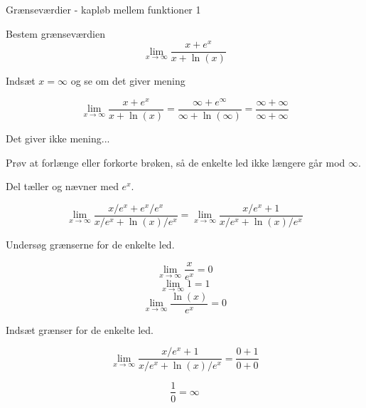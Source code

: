 \documentclass{article}
\begin{document}
\tableofcontents
\newpage

\begin{exercise}{Grænseværdier - kapløb mellem funktioner 1}

Bestem grænseværdien
\[
\lim_{x \to \infty} \frac{x + e^x}{x + \ln(x)}
\]


\hint
Indsæt $x=\infty$ og se om det giver mening

\hint
\[
\lim_{x \to \infty} \frac{x + e^x}{x + \ln(x)} = \frac{\infty + e^\infty}{\infty + \ln(\infty)} = \frac{\infty + \infty}{\infty + \infty}
\]

\hint
Det giver ikke mening...

\hint
Prøv at forlænge eller forkorte brøken, så de enkelte led ikke længere går mod $\infty$.

\hint
Del tæller og nævner med $e^x$.

\hint
\[
 \lim_{x \to \infty} \frac{x/e^x + e^x/e^x}{x/e^x + \ln(x)/e^x} = \lim_{x \to \infty} \frac{x/e^x + 1}{x/e^x + \ln(x)/e^x}
\]

\hint
Undersøg grænserne for de enkelte led.

\hint
\[
\lim_{x \to \infty} \frac{x}{e^x} = 0
\]
\[
\lim_{x \to \infty} 1 = 1
\]
\[
\lim_{x \to \infty} \frac{\ln(x)}{e^x} = 0
\]

\hint
Indsæt grænser for de enkelte led.

\hint
\[
\lim_{x \to \infty} \frac{x/e^x + 1}{x/e^x + \ln(x)/e^x} = \frac{0 + 1}{0 + 0}
\]

\hint
\[
\frac{1}{0} = \infty
\]

\end{exercise}
\newpage
\end{document}
